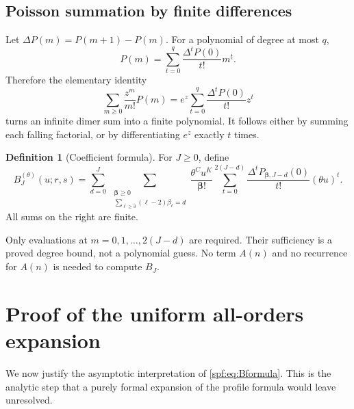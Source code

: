 \documentclass[11pt]{article}
\numberwithin{equation}{section}
\theoremstyle{definition}
\newtheorem{definition}[theorem]{Definition}
\theoremstyle{remark}
\theoremstyle{definition}
\newcommand{\fall}[2]{{#1}^{\underline{#2}}}
\newcommand{\betafac}{\boldsymbol\beta!}
\begin{document}
\subsection{Poisson summation by finite differences}

Let $\Delta P(m)=P(m+1)-P(m)$. For a polynomial of degree at most $q$,
\begin{equation}
 P(m)=\sum_{t=0}^{q}\frac{\Delta^tP(0)}{t!}\fall mt.
\end{equation}
Therefore the elementary identity
\begin{equation}
 \sum_{m\ge0}\frac{z^m}{m!}P(m)
  =e^z\sum_{t=0}^{q}\frac{\Delta^tP(0)}{t!}z^t
 \label{spf:eq:poisson-transform}
\end{equation}
turns an infinite dimer sum into a finite polynomial. It follows either by
summing each falling factorial, or by differentiating $e^z$ exactly $t$ times.

\begin{definition}[Coefficient formula]
\label{spf:def:B}
For $J\ge0$, define
\begin{equation}
 \boxed{\displaystyle
 B_J^{(\theta)}(u;r,s)=
 \sum_{d=0}^{J}
 \ \sum_{\substack{\boldsymbol\beta\ge0\\
                   \sum_{\ell\ge3}(\ell-2)\beta_\ell=d}}
 \frac{\theta^C u^K}{\betafac}
 \sum_{t=0}^{2(J-d)}
 \frac{\Delta^t P_{\boldsymbol\beta,J-d}(0)}{t!}(\theta u)^t .}
 \label{spf:eq:Bformula}
\end{equation}
All sums on the right are finite.
\end{definition}

Only evaluations at $m=0,1,\ldots,2(J-d)$ are required. Their sufficiency is a
proved degree bound, not a polynomial guess. No term $A(n)$ and no recurrence
for $A(n)$ is needed to compute $B_J$.

\section{Proof of the uniform all-orders expansion}
\label{spf:sec:proof}

We now justify the asymptotic interpretation of \eqref{spf:eq:Bformula}. This is
the analytic step that a purely formal expansion of the profile formula would
leave unresolved.
\end{document}
